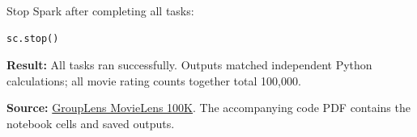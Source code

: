\documentclass[10pt,a4paper]{article}
\begin{document}
Stop Spark after completing all tasks:
\begin{lstlisting}
sc.stop()
\end{lstlisting}
\textbf{Result:} All tasks ran successfully. Outputs matched independent Python
calculations; all movie rating counts together total 100,000.

\textbf{Source:} \href{https://grouplens.org/datasets/movielens/100k/}{GroupLens MovieLens 100K}.
The accompanying code PDF contains the notebook cells and saved outputs.
\end{document}
